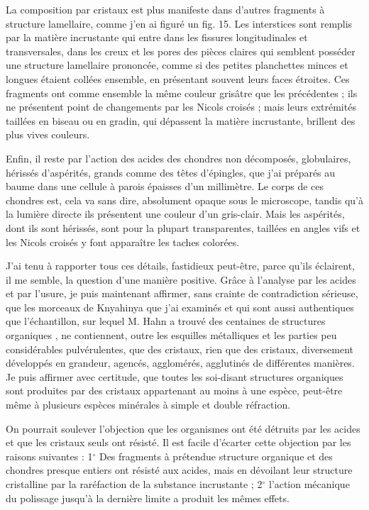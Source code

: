 \documentclass[a4paper, 12pt, oneside, french]{article}
\begin{document}
La composition par cristaux est plus manifeste dans d'autres fragments à structure lamellaire, comme j'en ai figuré un fig. 15. Les interstices sont remplis par la matière incrustante qui entre dans les fissures longitudinales et transversales, dans les creux et les pores des pièces claires qui semblent posséder une structure lamellaire prononcée, comme si des petites planchettes minces et longues étaient collées ensemble, en présentant souvent leurs faces étroites. Ces fragments ont comme ensemble la même couleur grisâtre que les précédentes ; ils ne présentent point de changements par les Nicols croisés ; mais leurs extrémités taillées en biseau ou en gradin, qui dépassent la matière incrustante, brillent des plus vives couleurs.

Enfin, il reste par l'action des acides des chondres non décomposés, globulaires, hérissés d'aspérités, grands comme des têtes d'épingles, que j'ai préparés au baume dans une cellule à parois épaisses d'un millimètre. Le corps de ces chondres est, cela va sans dire, absolument opaque sous le microscope, tandis qu'à la lumière directe ils présentent une couleur d'un gris-clair. Mais les aspérités, dont ils sont hérissés, sont pour la plupart transparentes, taillées en angles vifs et les Nicols croisés y font apparaître les taches colorées.

J'ai tenu à rapporter tous ces détails, fastidieux peut-être, parce qu'ils éclairent, il me semble, la question d'une manière positive. Grâce à l'analyse par les acides et par l'usure, je puis maintenant affirmer, sans crainte de contradiction sérieuse, que les morceaux de Knyahinya que j'ai examinés et qui sont aussi authentiques que l'échantillon, sur lequel M. Hahn a trouvé \og des centaines de structures organiques \fg, ne contiennent, outre les esquilles métalliques et les parties peu considérables pulvérulentes, que des cristaux, rien que des cristaux, diversement développés en grandeur, agencés, agglomérés, agglutinés de différentes manières. Je puis affirmer avec certitude, que toutes les soi-disant structures organiques sont produites par des cristaux appartenant au moins à une espèce, peut-être même à plusieurs espèces minérales à simple et double réfraction.

On pourrait soulever l'objection que les organismes ont été détruits par les acides et que les cristaux seuls ont résisté. Il est facile d'écarter cette objection par les raisons suivantes : 1$^{\circ}$ Des fragments à prétendue structure organique et des chondres presque entiers ont résisté aux acides, mais en dévoilant leur structure cristalline par la raréfaction de la substance incrustante ; 2$^{\circ}$ l'action mécanique du polissage jusqu'à la dernière limite a produit les mêmes effets.
\end{document}
